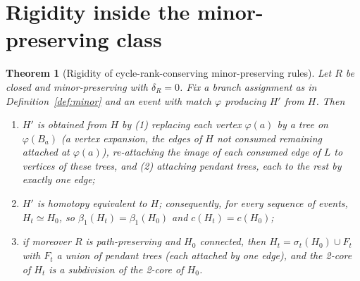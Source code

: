 \documentclass[10pt]{article}
\theoremstyle{definition}
\theoremstyle{plain}
\newtheorem{theorem}{Theorem}
\theoremstyle{remark}
\newcommand{\Betti}{\beta_1}
\begin{document}
\section{Rigidity inside the minor-preserving class}\label{sec:rigid}
\begin{theorem}[Rigidity of cycle-rank-conserving minor-preserving rules]\label{thm:rigid}
Let $R$ be closed and minor-preserving with $\delta_R=0$. Fix a branch assignment as in Definition~\ref{def:minor} and an event with match $\varphi$ producing $H'$ from $H$. Then
\begin{enumerate}
\item[(i)] $H'$ is obtained from $H$ by (1) replacing each vertex $\varphi(a)$ by a tree on $\varphi(B_a)$ (a vertex expansion, the edges of $H$ not consumed remaining attached at $\varphi(a)$), re-attaching the image of each consumed edge of $L$ to vertices of these trees, and (2) attaching pendant trees, each to the rest by exactly one edge;
\item[(ii)] $H'$ is homotopy equivalent to $H$; consequently, for every sequence of events, $H_t\simeq H_0$, so $\Betti(H_t)=\Betti(H_0)$ and $c(H_t)=c(H_0)$;
\item[(iii)] if moreover $R$ is path-preserving and $H_0$ connected, then $H_t=\sigma_t(H_0)\cup F_t$ with $F_t$ a union of pendant trees (each attached by one edge), and the 2-core of $H_t$ is a subdivision of the 2-core of $H_0$.
\end{enumerate}
\end{theorem}
\end{document}
